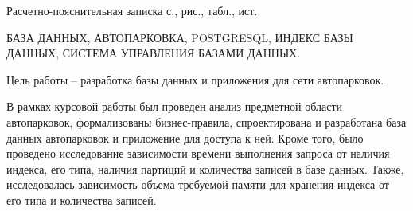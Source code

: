 
Расчетно-пояснительная записка \pageref{LastPage} с.,  рис.,  табл.,  ист.

БАЗА ДАННЫХ, АВТОПАРКОВКА, POSTGRESQL, ИНДЕКС БАЗЫ ДАННЫХ, СИСТЕМА УПРАВЛЕНИЯ БАЗАМИ ДАННЫХ.

Цель работы -- разработка базы данных и приложения для сети автопарковок.

В рамках курсовой работы был проведен анализ предметной области автопарковок, формализованы  бизнес-правила, спроектирована и разработана база данных автопарковок и приложение для доступа к ней.
Кроме того, было проведено исследование зависимости времени выполнения запроса от наличия индекса, его типа, наличия партиций и количества записей в базе данных.
Также, исследовалась зависимость объема требуемой памяти для хранения индекса от его типа и количества записей.
